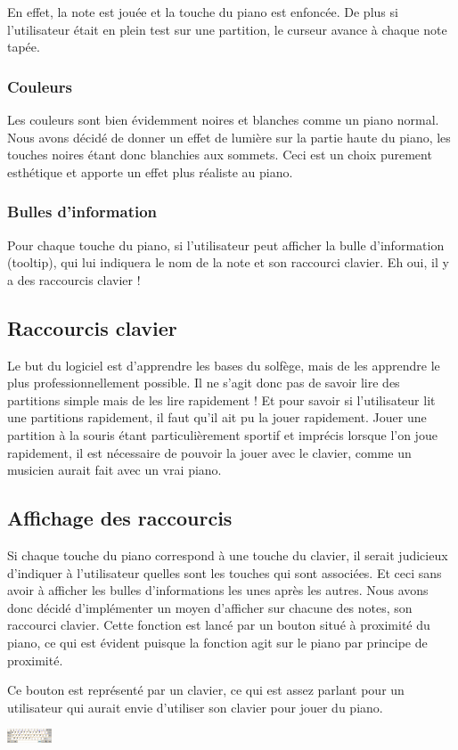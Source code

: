 \documentclass{article}
\begin{document}
En effet, la note est jouée et la touche du piano est enfoncée. De plus si l'utilisateur était en plein test sur une partition,
le curseur avance à chaque note tapée.
\subsubsection{Couleurs}
Les couleurs sont bien évidemment noires et blanches comme un piano normal. Nous avons décidé de donner un effet de lumière 
sur la partie haute du piano, les touches noires étant donc blanchies aux sommets. Ceci est un choix purement esthétique et 
apporte un effet plus réaliste au piano.
\subsubsection{Bulles d'information}
Pour chaque touche du piano, si l'utilisateur peut afficher la bulle d'information (tooltip), qui lui indiquera le nom de la 
note et son raccourci clavier. Eh oui, il y a des raccourcis clavier !
\subsection{Raccourcis clavier}
Le but du logiciel est d'apprendre les bases du solfège, mais de les apprendre le plus professionnellement possible.
Il ne s’agit donc pas de savoir lire des partitions simple mais de les lire rapidement !
Et pour savoir si l'utilisateur lit une partitions rapidement, il faut qu'il ait pu la jouer rapidement.
Jouer une partition à la souris étant particulièrement sportif et imprécis lorsque l'on joue rapidement, il est nécessaire
de pouvoir la jouer avec le clavier, comme un musicien aurait fait avec un vrai piano.
\subsection{Affichage des raccourcis}
Si chaque touche du piano correspond à une touche du clavier, il serait judicieux d'indiquer à l'utilisateur quelles sont les touches
qui sont associées. Et ceci sans avoir à afficher les bulles d'informations les unes après les autres. Nous avons donc décidé d'implémenter
un moyen d'afficher sur chacune des notes, son raccourci clavier. Cette fonction est lancé par un bouton situé à proximité du piano, ce qui
est évident puisque la fonction agit sur le piano par principe de proximité.


Ce bouton est représenté par un clavier, ce qui est assez parlant pour un utilisateur qui aurait envie d'utiliser son clavier 
pour jouer du piano.
\begin{center}
\includegraphics[width = 50px]{./images/clavier.png}
\end{center}
\end{document}
